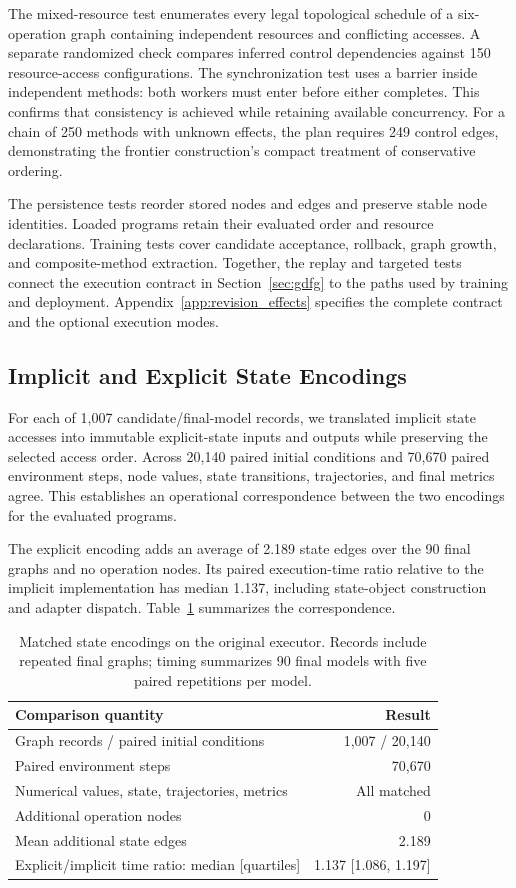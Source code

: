 The mixed-resource test enumerates every legal topological schedule of a six-operation graph containing independent resources and conflicting accesses. A separate randomized check compares inferred control dependencies against 150 resource-access configurations. The synchronization test uses a barrier inside independent methods: both workers must enter before either completes. This confirms that consistency is achieved while retaining available concurrency. For a chain of 250 methods with unknown effects, the plan requires 249 control edges, demonstrating the frontier construction's compact treatment of conservative ordering.

The persistence tests reorder stored nodes and edges and preserve stable node identities. Loaded programs retain their evaluated order and resource declarations. Training tests cover candidate acceptance, rollback, graph growth, and composite-method extraction. Together, the replay and targeted tests connect the execution contract in Section~\ref{sec:gdfg} to the paths used by training and deployment. Appendix~\ref{app:revision_effects} specifies the complete contract and the optional execution modes.

\subsection{Implicit and Explicit State Encodings}
For each of 1,007 candidate/final-model records, we translated implicit state accesses into immutable explicit-state inputs and outputs while preserving the selected access order. Across 20,140 paired initial conditions and 70,670 paired environment steps, node values, state transitions, trajectories, and final metrics agree. This establishes an operational correspondence between the two encodings for the evaluated programs.

The explicit encoding adds an average of 2.189 state edges over the 90 final graphs and no operation nodes. Its paired execution-time ratio relative to the implicit implementation has median 1.137, including state-object construction and adapter dispatch. Table~\ref{tab:encoding_main} summarizes the correspondence.

\begin{table}[tb]
\centering\small
\caption{Matched state encodings on the original executor. Records include repeated final graphs; timing summarizes 90 final models with five paired repetitions per model.}
\label{tab:encoding_main}
\begin{tabular}{lr}
\toprule
Comparison quantity & Result \\
\midrule
Graph records / paired initial conditions & 1,007 / 20,140 \\
Paired environment steps & 70,670 \\
Numerical values, state, trajectories, metrics & All matched \\
Additional operation nodes & 0 \\
Mean additional state edges & 2.189 \\
Explicit/implicit time ratio: median [quartiles] & 1.137 [1.086, 1.197] \\
\bottomrule
\end{tabular}
\end{table}

